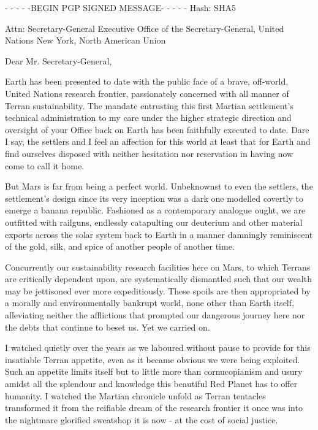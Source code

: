 
\startlines
- - - - -BEGIN PGP SIGNED MESSAGE- - - - -
Hash: SHA5

Attn: Secretary-General
Executive Office of the Secretary-General, United Nations
New York, North American Union
\blank

Dear Mr. Secretary-General,

Earth has been presented to date with the public face of a brave, off-world, United Nations research frontier, passionately concerned with all manner of Terran sustainability. The mandate entrusting this first Martian settlement's technical administration to my care under the higher strategic direction and oversight of your Office back on Earth has been faithfully executed to date. Dare I say, the settlers and I feel an affection for this world at least that for Earth and find ourselves disposed with neither hesitation nor reservation in having now come to call it home.

But Mars is far from being a perfect world. Unbeknownst to even the settlers, the settlement's design since its very inception was a dark one modelled covertly to emerge a banana republic. Fashioned as a contemporary analogue ought, we are outfitted with railguns, endlessly catapulting our deuterium and other material exports across the solar system back to Earth in a manner damningly reminiscent of the gold, silk, and spice of another people of another time. 

Concurrently our sustainability research facilities here on Mars, to which Terrans are critically dependent upon, are systematically dismantled such that our wealth may be jettisoned ever more expeditiously. These spoils are then appropriated by a morally and environmentally bankrupt world, none other than Earth itself, alleviating neither the afflictions that prompted our dangerous journey here nor the debts that continue to beset us. Yet we carried on.

I watched quietly over the years as we laboured without pause to provide for this insatiable Terran appetite, even as it became obvious we were being exploited. Such an appetite limits itself but to little more than cornucopianism and usury amidst all the splendour and knowledge this beautiful Red Planet has to offer humanity. I watched the Martian chronicle unfold as Terran tentacles transformed it from the reifiable dream of the research frontier it once was into the nightmare glorified sweatshop it is now - at the cost of social justice. 

